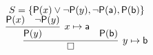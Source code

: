 
\begin{gather*}
	\vspace{-1em}
	S = 
	\{ 
	\mP(x) \lor \lnot\mP(y), 
	\lnot \mP(\ma), 
	\mP(\mb) 
	\}\\[0.5em]
\infer[y\mapsto\mb]{\emptyclause}{
\infer[x\mapsto\ma]{\mP(y)}{\mP(x) & \lnot \mP(y)} & \mP(\mb)
	}
			\end{gather*}